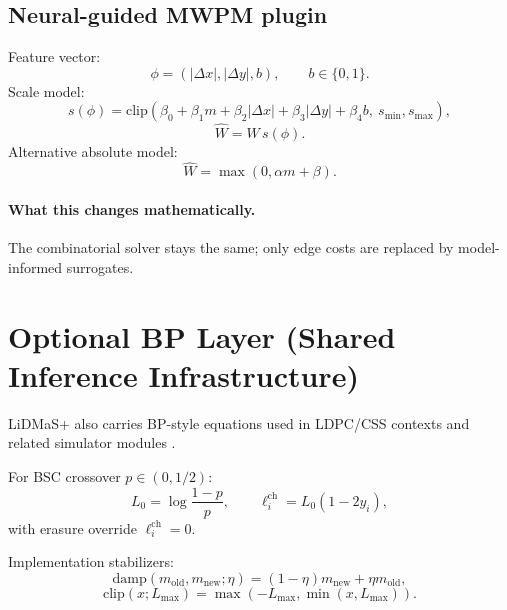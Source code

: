 \documentclass[11pt]{article}
\begin{document}
\subsection{Neural-guided MWPM plugin}
Feature vector:
\begin{equation}
\phi=(|\Delta x|,|\Delta y|,b),\qquad b\in\{0,1\}.
\end{equation}
Scale model:
\begin{equation}
s(\phi)=\mathrm{clip}\!\left(\beta_0+\beta_1m+\beta_2|\Delta x|+\beta_3|\Delta y|+\beta_4b,\ s_{\min},s_{\max}\right),
\end{equation}
\begin{equation}
\hat W=W\,s(\phi).
\end{equation}
Alternative absolute model:
\begin{equation}
\hat W=\max(0,\alpha m+\beta).
\end{equation}

\paragraph{What this changes mathematically.}
The combinatorial solver stays the same; only edge costs are replaced by model-informed surrogates.

\section{Optional BP Layer (Shared Inference Infrastructure)}
LiDMaS+ also carries BP-style equations used in LDPC/CSS contexts and related simulator modules \cite{stim2021}.

For BSC crossover $p\in(0,1/2)$:
\begin{equation}
L_0=\log\frac{1-p}{p},\qquad
\ell_i^{\mathrm{ch}}=L_0(1-2y_i),
\end{equation}
with erasure override $\ell_i^{\mathrm{ch}}=0$.

Implementation stabilizers:
\begin{equation}
\mathrm{damp}(m_{\mathrm{old}},m_{\mathrm{new}};\eta)=(1-\eta)m_{\mathrm{new}}+\eta m_{\mathrm{old}},
\end{equation}
\begin{equation}
\mathrm{clip}(x;L_{\max})=\max(-L_{\max},\min(x,L_{\max})).
\end{equation}
\end{document}
